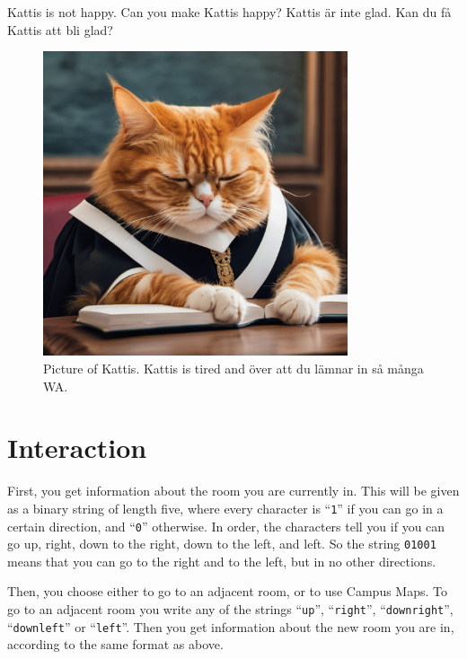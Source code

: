 
Kattis is not happy. Can you make Kattis happy?
Kattis är inte glad. Kan du få Kattis att bli glad?

\begin{centering}
  \begin{figure}[h]
      \centering
      \includegraphics[width=0.8\textwidth]{tired-kattis.png}
      \caption{Picture of Kattis. Kattis is tired and  över att du lämnar in så många WA. }
  \end{figure}
\end{centering}


\section*{Interaction}
First, you get information about the room you are currently in. 
This will be given as a binary string of length five, where every character is ``\texttt{1}'' if you can go in a certain direction, and ``\texttt{0}'' otherwise.
In order, the characters tell you if you can go up, right, down to the right, down to the left, and left.
So the string \texttt{01001} means that you can go to the right and to the left, but in no other directions.

Then, you choose either to go to an adjacent room, or to use Campus Maps.
To go to an adjacent room you write any of the strings 
``\texttt{up}'', ``\texttt{right}'', ``\texttt{downright}'', ``\texttt{downleft}'' or ``\texttt{left}''.
Then you get information about the new room you are in, according to the same format as above.

